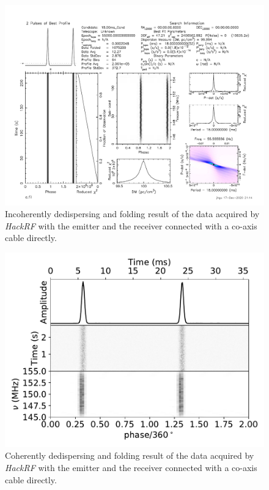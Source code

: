 \documentclass[fleqn,usenatbib]{mnras}
\begin{document}
\begin{figure}
    \centering
    \includegraphics[width=\columnwidth]{prepfold_direct_hackrf_dm100_18.pdf}
    \caption{Incoherently dedispersing and folding result of the data acquired by \textit{HackRF} with the emitter and the receiver connected with a co-axis cable directly.}
    \label{fig:prepfold_direct_hackrf_dm100_18}
\end{figure}

\begin{figure}
    \centering
    \includegraphics[width=\columnwidth]{cddsp_direct_hackrf_dm100_18.pdf}
    \caption{Coherently dedispersing and folding result of the data acquired by \textit{HackRF} with the emitter and the receiver connected with a co-axis cable directly.}
    \label{fig:cddsp_direct_hackrf_dm100_18}
\end{figure}
\end{document}
